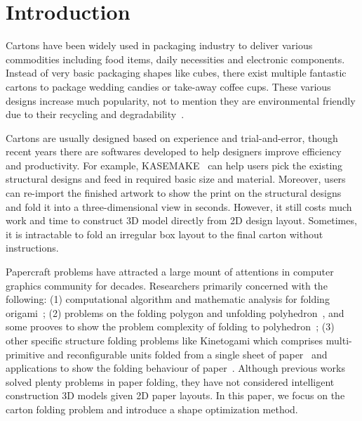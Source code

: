 \section{Introduction}

Cartons have been widely used in packaging industry to deliver various commodities including food items, daily necessities and electronic components. Instead of very basic packaging shapes like cubes, there exist multiple fantastic cartons to package wedding candies or take-away coffee cups. These various designs increase much popularity, not to mention they are environmental friendly due to their recycling and degradability~\cite{Mullineux:2010:CSC:1739328.1739673}.

Cartons are usually designed based on experience and trial-and-error, though recent years there are softwares developed to help designers improve efficiency and productivity.
For example, KASEMAKE~\cite{KASEMAKE} can help users pick the existing structural designs and feed in required basic size and material.
Moreover, users can re-import the finished artwork to show the print on the structural designs and fold it into a three-dimensional view in seconds. 
However, it still costs much work and time to construct 3D model directly from 2D design layout. Sometimes, it is intractable to fold an irregular box layout to the final carton without instructions.

Papercraft problems have attracted a large mount of attentions in computer graphics community for decades.
Researchers primarily concerned with the following: (1) computational algorithm and mathematic analysis for folding origami~\cite{Ida:2007:MOC:1802954.1803021,Lang:1996:CAO:237218.237249,xl-idetc-14}; (2) problems on the folding polygon and unfolding polyhedron~\cite{Bern:2003:UPC:636968.636970,O'Rourke:1998:FUC:646319.686376,Rourke2008Unfolding}, and some prooves to show the problem complexity of folding to polyhedron~\cite{Biedl:2005:NFP:1090462.1646553,Biedl2004When,Lubiw1996When}; (3) other specific structure folding problems like Kinetogami which comprises multi-primitive and reconfigurable units folded from a single sheet of paper~\cite{Gao2013Kinetogami} and applications to show the folding behaviour of paper~\cite{Thiel1998,Kishi:1998:OFP:786112.786279,Nimnual2007Virtual,Shimanuki2009Construction}. 
%
Although previous works solved plenty problems in paper folding, they have not considered intelligent construction 3D models given 2D paper layouts. 
In this paper, we focus on the carton folding problem and introduce a shape optimization method.

